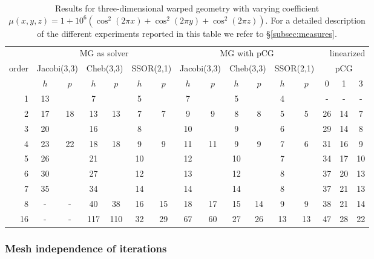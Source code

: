 \documentclass[smallcondensed,final]{svjour3}     %
\begin{document}
\begin{table}
  \caption{\label{tab:3d-fan} Results for three-dimensional warped
    geometry with varying coefficient $\mu(x,y,z) = 1 +
    10^6(\cos^2(2\pi x) + \cos^2(2\pi y) + \cos^2(2\pi z))$. For a
    detailed description of the different experiments reported in this
    table we refer to \S\ref{subsec:measures}.}  \centering
	  \begin{tabular}{|r|c c|c c|c c||c c|c c|c c||c c c|} 
	    \hline
	    & \multicolumn{6}{c||}{MG as solver} & \multicolumn{6}{c||}{MG with pCG} & \multicolumn{3}{r|}{linearized} \\
	    \cline{2-13}
	    \!\!\! order \!\!\!\! &  \multicolumn{2}{c|}{\!\!\scriptsize  Jacobi(3,3)\!\!} &  \multicolumn{2}{c|}{\!\!\scriptsize Cheb(3,3)\!\!} & \multicolumn{2}{c||}{\!\!\scriptsize  SSOR(2,1)\!\!} & \multicolumn{2}{c|}{\!\!\scriptsize Jacobi(3,3)\!\!} &  \multicolumn{2}{c|}{\!\!\scriptsize Cheb(3,3)\!\!} & \multicolumn{2}{c||}{\!\!\scriptsize SSOR(2,1)\!\!} & \multicolumn{3}{c|}{pCG}\\
	\hline
	 & $h$ & $p$ & $h$ & $p$& $h$ & $p$& $h$ & $p$& $h$ & $p$& $h$ & $p$& 0 & 1 & 3\\
	 \cline{2-16}
1 & 13 & & 7 & & 5 & & 7 & & 5 & & 4 & & - & - & - \\
2 & 17 & 18 & 13 & 13 & 7 & 7 & 9 & 9 & 8 & 8 & 5 & 5 & 26 & 14 & 7 \\
3 & 20 & & 16 & & 8 & & 10 & & 9 & & 6 & & 29 & 14 & 8 \\
4 & 23 & 22 & 18 & 18 & 9 & 9 & 11 & 11 & 9 & 9 & 7 & 6 & 31 & 16 & 9\\
5 & 26 & & 21 & & 10 & & 12 & & 10 & & 7 & & 34 & 17 & 10  \\
6 & 30 & & 27 & & 12 & & 13 & & 12 & & 8 & & 37 & 20 & 13 \\
7 & 35 & & 34 & & 14 & & 14 & & 14 & & 8 & & 37 & 21 & 13  \\
8 & - & - & 40 & 38 & 16 & 15 & 18 & 17 & 15 & 14 & 9 & 9 & 38 & 21 & 14 \\
16 & - & - & 117 & 110 & 32 & 29 & 67 & 60 & 27 & 26 & 13 & 13 & 47 & 28 & 22 \\
\hline
  \end{tabular}
\end{table}

\subsubsection{Mesh independence of iterations}\label{subsec:num_mesh}
\end{document}
